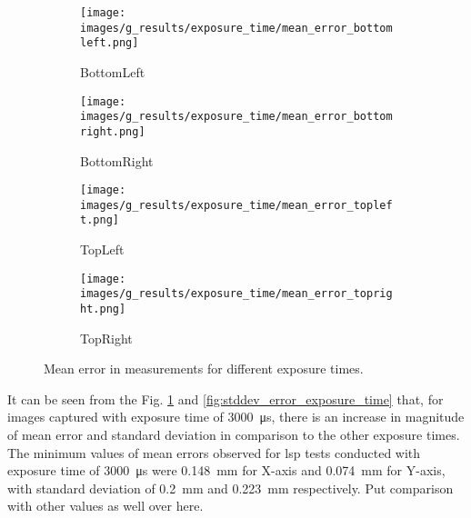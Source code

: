 \begin{figure}[ht]
    \centering
    \begin{subfigure}[b]{0.46\textwidth}
        \centering
        \texttt{[image: images/g\_results/exposure\_time/mean\_error\_bottomleft.png]}
        \caption{\textsf{BottomLeft}}
    \end{subfigure}
    \hspace{1cm}
    \begin{subfigure}[b]{0.46\textwidth}
        \centering
        \texttt{[image: images/g\_results/exposure\_time/mean\_error\_bottomright.png]}
        \caption{\textsf{BottomRight}}
    \end{subfigure}

    \vspace{5mm}
    
    \begin{subfigure}[b]{0.46\textwidth}
        \centering
        \texttt{[image: images/g\_results/exposure\_time/mean\_error\_topleft.png]}
        \caption{\textsf{TopLeft}}
    \end{subfigure}
    \hspace{1cm}
    \begin{subfigure}[b]{0.46\textwidth}
        \centering
        \texttt{[image: images/g\_results/exposure\_time/mean\_error\_topright.png]}
        \caption{\textsf{TopRight}}
    \end{subfigure}

    \caption{Mean error in measurements for different exposure times.}
    \label{fig:mean_error_exposure_time}
\end{figure}

\vspace{5mm}
\noindent It can be seen from the Fig. \ref{fig:mean_error_exposure_time} and \ref{fig:stddev_error_exposure_time} that, for images captured with exposure time of \SI{3000}{\micro\second}, there is an increase in magnitude of mean error and standard deviation in comparison to the other exposure times. The minimum values of mean errors observed for \gls{lsp} tests conducted with exposure time of \SI{3000}{\micro\second} were \SI{0.148}{\milli\meter} for X-axis and \SI{0.074}{\milli\meter} for Y-axis, with standard deviation of \SI{0.2}{\milli\meter} and \SI{0.223}{\milli\meter} respectively. Put comparison with other values as well over here.

